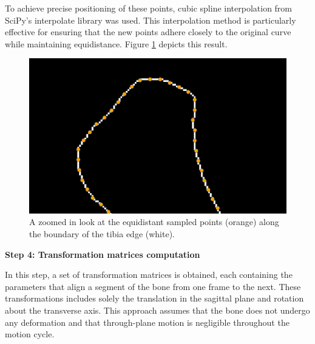 \documentclass{micro-econ-thesis}
\begin{document}
To achieve precise positioning of these points, cubic spline interpolation from SciPy's interpolate library was used. This interpolation method is particularly effective for ensuring that the new points adhere closely to the original curve while maintaining equidistance. 
Figure \ref{fig:downsampled} depicts this result. 
\begin{figure}[H]
	\centering
	\includegraphics[width=0.7\linewidth]{downsampled}
	\caption{A zoomed in look at the equidistant sampled points (orange) along the boundary of the tibia edge (white).}
	\label{fig:downsampled}
\end{figure}

\textbf{Step 4: Transformation matrices computation}

In this step, a set of transformation matrices is obtained, each containing the parameters that align a segment of the bone from one frame to the next. These transformations includes solely the translation in the sagittal plane and rotation about the transverse axis. This approach assumes that the bone does not undergo any deformation and that through-plane motion is negligible throughout the motion cycle. 
\end{document}
